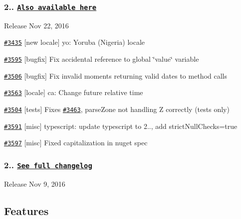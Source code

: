 \subsubsection*{2.. \href{https://gist.github.com/ichernev/ed58f76fb95205eeac653d719972b90c}{\tt Also available here}}


\begin{DoxyItemize}
\item Release Nov 22, 2016
\item \href{https://github.com/moment/moment/pull/3435}{\tt \#3435} \mbox{[}new locale\mbox{]} yo\+: Yoruba (Nigeria) locale
\item \href{https://github.com/moment/moment/pull/3595}{\tt \#3595} \mbox{[}bugfix\mbox{]} Fix accidental reference to global \char`\"{}value\char`\"{} variable
\item \href{https://github.com/moment/moment/pull/3506}{\tt \#3506} \mbox{[}bugfix\mbox{]} Fix invalid moments returning valid dates to method calls
\item \href{https://github.com/moment/moment/pull/3563}{\tt \#3563} \mbox{[}locale\mbox{]} ca\+: Change future relative time
\item \href{https://github.com/moment/moment/pull/3504}{\tt \#3504} \mbox{[}tests\mbox{]} Fixes \href{https://github.com/moment/moment/issues/3463}{\tt \#3463}, parse\+Zone not handling Z correctly (tests only)
\item \href{https://github.com/moment/moment/pull/3591}{\tt \#3591} \mbox{[}misc\mbox{]} typescript\+: update typescript to 2.., add strict\+Null\+Checks=true
\item \href{https://github.com/moment/moment/pull/3597}{\tt \#3597} \mbox{[}misc\mbox{]} Fixed capitalization in nuget spec
\end{DoxyItemize}

\subsubsection*{2.. \href{https://gist.github.com/ichernev/17bffc1005a032cb1a8ac4c1558b4994}{\tt See full changelog}}


\begin{DoxyItemize}
\item Release Nov 9, 2016
\end{DoxyItemize}

\subsection*{Features}


